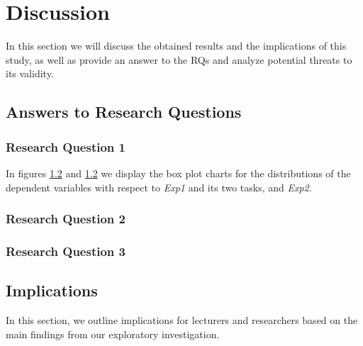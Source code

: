 \chapter{Discussion}
\label{chap:6_discussion}
In this section we will discuss the obtained results and the implications of this study, as well as provide an answer to the RQs and analyze potential threats to its validity.

\section{Answers to Research Questions}
\subsection{Research Question 1}
In figures \ref{} and \ref{} we display the box plot charts for the distributions of the dependent variables with respect to \textit{Exp1} and its two tasks, and \textit{Exp2}.


\subsection{Research Question 2}

\subsection{Research Question 3}

\section{Implications}
In this section, we outline implications for lecturers and researchers based on the main findings from our exploratory investigation. 

